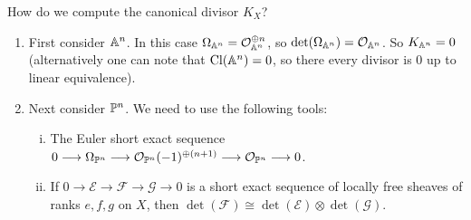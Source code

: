 \begin{example}
  How do we compute the canonical divisor
  $K_X$?
  \begin{enumerate}
    \item First consider $\mathbb{A}^n$.
      In this case $\Omega_{\mathbb{A}^n} = \mathcal{O}_{\mathbb{A}^n}^{\oplus n}$,
      so $\det(\Omega_{\mathbb{A}^n}) = \mathcal{O}_{\mathbb{A}^n}$.
      So $K_{\mathbb{A}^n} = 0$ (alternatively
      one can note that $\operatorname{Cl}(\mathbb{A}^n) = 0$,
      so there every divisor is $0$ up
      to linear equivalence).
    \item Next consider $\mathbb{P}^n$. We
      need to use the following tools:
      \begin{enumerate}[i)]
        \item The Euler short exact sequence
          $0 \longrightarrow \Omega_{\mathbb{P}^n} \longrightarrow \mathcal{O}_{\mathbb{P}^n}(-1)^{\oplus (n + 1)} \longrightarrow \mathcal{O}_{\mathbb{P}^n} \longrightarrow 0$.
        \item If $0 \longrightarrow \mathcal{E} \longrightarrow \mathcal{F} \longrightarrow \mathcal{G} \longrightarrow 0$ is a short exact sequence of locally free sheaves
          of ranks $e, f, g$ on $X$, then
          $\det(\mathcal{F}) \cong \det(\mathcal{E}) \otimes \det(\mathcal{G})$.


\end{enumerate}
\end{enumerate}
\end{example}
